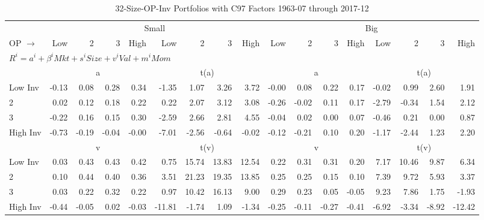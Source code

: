 
\begin{table}[!ht]
\footnotesize
\centering
\caption{32-Size-OP-Inv Portfolios with C97 Factors 1963-07 through 2017-12}
\begin{tabular}{lrrrrrrrrrrrrrrrr}
  \toprule
    & \multicolumn{8}{c}{Small} & \multicolumn{8}{c}{Big} \\
      \cmidrule(r){2-9} \cmidrule(r){10-17}
    OP $\rightarrow$ & Low & 2 & 3 & High & Low & 2 & 3 & High & Low & 2 & 3 & High & Low & 2 & 3 & High \\ 
  \midrule
  \multicolumn{17}{l}{$R^i=a^i+\beta^iMkt+s^iSize+v^iVal+m^iMom$} \\

  
    
      & \multicolumn{4}{c}{a} & \multicolumn{4}{c}{t(a)}
    
      & \multicolumn{4}{c}{a} & \multicolumn{4}{c}{t(a)}
    
    \\
      \cmidrule(r){2-5} \cmidrule(r){6-9} \cmidrule(r){10-13} \cmidrule(r){14-17}

    Low Inv   & -0.13  & 0.08  & 0.28  & 0.34  & -1.35  & 1.07  & 3.26  & 3.72  & -0.00  & 0.08  & 0.22  & 0.17  & -0.02  & 0.99  & 2.60  & 1.91  \\
           2  & 0.02  & 0.12  & 0.18  & 0.22  & 0.22  & 2.07  & 3.12  & 3.08  & -0.26  & -0.02  & 0.11  & 0.17  & -2.79  & -0.34  & 1.54  & 2.12  \\
           3  & -0.22  & 0.16  & 0.15  & 0.30  & -2.59  & 2.66  & 2.81  & 4.55  & -0.04  & 0.02  & 0.00  & 0.07  & -0.46  & 0.21  & 0.00  & 0.87  \\
    High Inv  & -0.73  & -0.19  & -0.04  & -0.00  & -7.01  & -2.56  & -0.64  & -0.02  & -0.12  & -0.21  & 0.10  & 0.20  & -1.17  & -2.44  & 1.23  & 2.20  \\

  
    
      & \multicolumn{4}{c}{v} & \multicolumn{4}{c}{t(v)}
    
      & \multicolumn{4}{c}{v} & \multicolumn{4}{c}{t(v)}
    
    \\
      \cmidrule(r){2-5} \cmidrule(r){6-9} \cmidrule(r){10-13} \cmidrule(r){14-17}

    Low Inv   & 0.03  & 0.43  & 0.43  & 0.42  & 0.75  & 15.74  & 13.83  & 12.54  & 0.22  & 0.31  & 0.31  & 0.20  & 7.17  & 10.46  & 9.87  & 6.34  \\
           2  & 0.10  & 0.44  & 0.40  & 0.36  & 3.51  & 21.23  & 19.35  & 13.85  & 0.25  & 0.25  & 0.15  & 0.10  & 7.39  & 9.72  & 5.93  & 3.37  \\
           3  & 0.03  & 0.22  & 0.32  & 0.22  & 0.97  & 10.42  & 16.13  & 9.00  & 0.29  & 0.23  & 0.05  & -0.05  & 9.23  & 7.86  & 1.75  & -1.93  \\
    High Inv  & -0.44  & -0.05  & 0.02  & -0.03  & -11.81  & -1.74  & 1.09  & -1.34  & -0.25  & -0.11  & -0.27  & -0.41  & -6.92  & -3.34  & -8.92  & -12.42  \\


\end{tabular}
\end{table}
